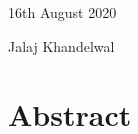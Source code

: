 \documentclass[a4paper]{article}
\begin{document}
16th August 2020

Jalaj Khandelwal
\section*{Abstract}
\newpage
\tableofcontents
\listoftables
\newpage
\listoffigures














\end{document}
